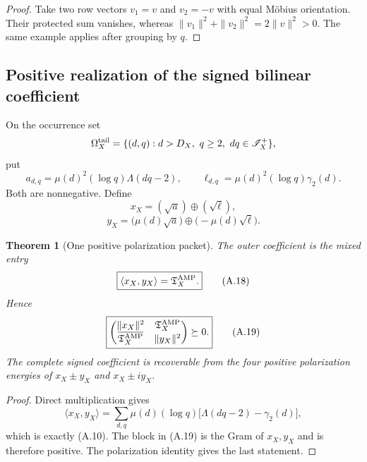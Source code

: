 \documentclass[11pt]{article}
\newtheorem{theorem}{Theorem}[section]
\theoremstyle{definition}
\theoremstyle{remark}
\begin{document}
\begin{proof}
Take two row vectors $v_1=v$ and $v_2=-v$ with equal M\"obius orientation.
Their protected sum vanishes, whereas
$\|v_1\|^2+\|v_2\|^2=2\|v\|^2>0$.
The same example applies after grouping by $q$.
\end{proof}

\subsection{Positive realization of the signed bilinear coefficient}
\label{subsec:affouter-positive-realization}

On the occurrence set
\[
 \Omega_X^{\rm tail}
 =\{(d,q):d>D_X,\ q\ge2,\ dq\in\mathscr I_X^+\},
\]
put
\[
 a_{d,q}=\mu(d)^2(\log q)\Lambda(dq-2),
 \qquad
 \ell_{d,q}=\mu(d)^2(\log q)\gamma_2(d).
\]
Both are nonnegative.  Define
\[
 x_X=(\sqrt a)\oplus(\sqrt\ell),
\]
\[
 y_X=\bigl(\mu(d)\sqrt a\bigr)
     \oplus\bigl(-\mu(d)\sqrt\ell\bigr).
\]

\begin{theorem}[One positive polarization packet]
\label{thm:affouter-polarization}
The outer coefficient is the mixed entry
\begin{equation}
 \label{eq:affouter-polarization}
 \boxed{
 \langle x_X,y_X\rangle
 =\mathfrak T_X^{\rm AMP}.}
 \tag{A.18}
\end{equation}
Hence
\begin{equation}
 \label{eq:affouter-positive-2x2}
 \boxed{
 \begin{pmatrix}
  \|x_X\|^2&\mathfrak T_X^{\rm AMP}\\
  \overline{\mathfrak T_X^{\rm AMP}}&\|y_X\|^2
 \end{pmatrix}
 \succeq0.}
 \tag{A.19}
\end{equation}
The complete signed coefficient is recoverable from the four positive
polarization energies of $x_X\pm y_X$ and $x_X\pm iy_X$.
\end{theorem}

\begin{proof}
Direct multiplication gives
\[
 \langle x_X,y_X\rangle
 =\sum_{d,q}\mu(d)(\log q)
  \bigl[\Lambda(dq-2)-\gamma_2(d)\bigr],
\]
which is exactly \textup{(A.10)}.  The block in \textup{(A.19)} is the Gram of $x_X,y_X$ and is
therefore positive.  The polarization identity gives the last statement.
\end{proof}
\end{document}
